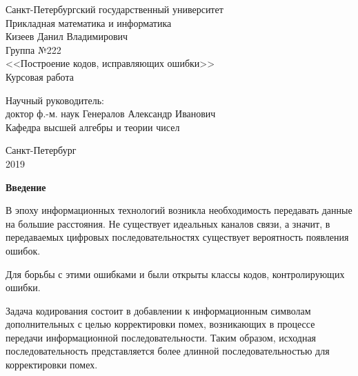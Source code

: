 \documentclass{article}
\begin{document}
    \begin{center}
        \hfill \break 
        \large{Санкт-Петербургский государственный университет} \\
        \large{Прикладная математика и информатика} \\
        \hfill \break
        \hfill\break
        \hfill \break
        \hfill \break
        \hfill \break      
        \large{Кизеев Данил Владимирович} \\
        \large{Группа №222} \\
        \hfill \break
        \hfill \break
        \hfill \break  
        \large{<<Построение кодов, исправляющих ошибки>>\ } \\
        \hfill \break
        \hfill \break
        \large{Курсовая работа}
    \end{center}
    \hfill \break
    \hfill \break
    \hfill \break
    \hfill \break
    
    \begin{flushright}
        \large{Научный руководитель:} \\
        \large{доктор ф.-м. наук Генералов Александр Иванович} \\
        \large{Кафедра высшей алгебры и теории чисел}\\
    \end{flushright}
    \hfill \break
    \hfill \break
    
    \begin{center}
        \large{Санкт-Петербург} \\
        \large{2019}\\
    \end{center}
    \thispagestyle{empty}   %
    
    \newpage
        \begin{center}
            \large \textbf{Введение}
        \end{center}
            \hfill \break
            \hfill \break
            В эпоху информационных технологий возникла необходимость передавать данные на большие расстояния. Не существует идеальных каналов связи, а значит, в передаваемых цифровых последовательностях существует вероятность появления ошибок.    
            
            Для борьбы с этими ошибками и были открыты классы кодов, контролирующих ошибки.
             
            Задача кодирования состоит в добавлении к информационным символам дополнительных с целью корректировки помех, возникающих в процессе передачи информационной последовательности.
            Таким образом, исходная последовательность представляется более длинной последовательностью для корректировки помех.
            
\end{document}
